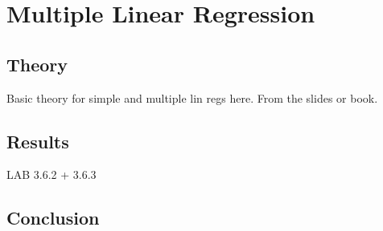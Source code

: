 \section{Multiple Linear Regression}\label{sc:multipleLinearRegression}

\subsection{Theory}

Basic theory for simple and multiple lin regs here. From the slides or book.

\subsection{Results}

LAB 3.6.2 + 3.6.3

\subsection{Conclusion}